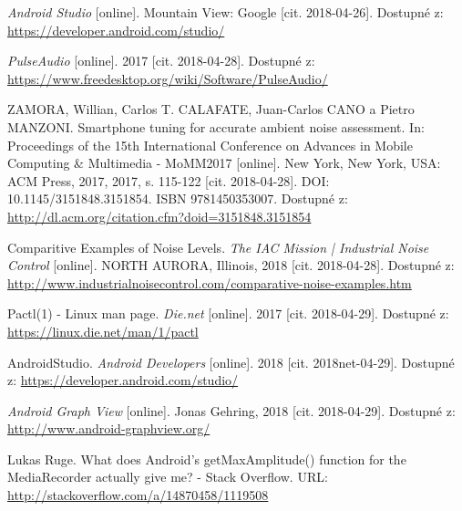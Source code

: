 \documentclass[journal, a4paper]{IEEEtran}
\begin{document}
\begin{thebibliography}{10}
\newline

		\textit{Android Studio} [online]. Mountain View: Google [cit. 2018-04-26]. Dostupné z: \url{https://developer.android.com/studio/}
\newline

		\textit{PulseAudio} [online]. 2017 [cit. 2018-04-28]. Dostupné z: \url{https://www.freedesktop.org/wiki/Software/PulseAudio/}
\newline

		ZAMORA, Willian, Carlos T. CALAFATE, Juan-Carlos CANO a Pietro MANZONI. Smartphone tuning for accurate ambient noise assessment. In: Proceedings of the 15th International Conference on Advances in Mobile Computing & Multimedia - MoMM2017 [online]. New York, New York, USA: ACM Press, 2017, 2017, s. 115-122 [cit. 2018-04-28]. DOI: 10.1145/3151848.3151854. ISBN 9781450353007. Dostupné z: \url{http://dl.acm.org/citation.cfm?doid=3151848.3151854}
\newline

		Comparitive Examples of Noise Levels. \textit{The IAC Mission | Industrial Noise Control} [online]. NORTH AURORA, Illinois, 2018 [cit. 2018-04-28]. Dostupné z: \url{http://www.industrialnoisecontrol.com/comparative-noise-examples.htm}
\newline

		Pactl(1) - Linux man page. \textit{Die.net} [online]. 2017 [cit. 2018-04-29]. Dostupné z: \url{https://linux.die.net/man/1/pactl}
\newline

		AndroidStudio. \textit{Android Developers} [online]. 2018 [cit. 2018net-04-29]. Dostupné z: \url{https://developer.android.com/studio/}
\newline

	\textit{Android Graph View} [online]. Jonas Gehring, 2018 [cit. 2018-04-29]. Dostupné z: \url{http://www.android-graphview.org/}
\newline

		Lukas Ruge. What does Android’s getMaxAmplitude() function for the
		MediaRecorder actually give me? - Stack Overflow. URL: \url{http://stackoverflow.com/a/14870458/1119508}

\end{thebibliography}

\end{document}
